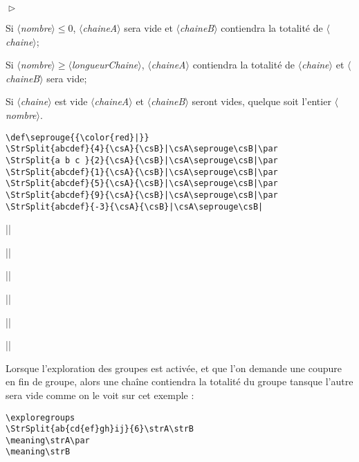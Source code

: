 \documentclass[a4paper,10pt,french]{article}
\newcommand\argu[1]{$\langle$\textit{#1}$\rangle$}
\newenvironment{Conditions}[1][1cm]%
{\begin{list}%
	{$\vartriangleright$}%
	{\setlength{\leftmargin}{#1}
	 \setlength{\itemsep}{0pt}
	 \setlength{\parsep}{0pt}
	 \setlength{\topsep}{2ptplus3ptminus2pt}
	}}%
{\end{list}}
\newcommand\styleexercice{\footnotesize}
\begin{document}
\begin{Conditions}
	\item Si \argu{nombre}${}\leqslant0$, \argu{chaineA} sera vide et \argu{chaineB} contiendra la totalité de \argu{chaine};
	\item Si \argu{nombre}${}\geqslant$\argu{longueurChaine}, \argu{chaineA} contiendra la totalité de \argu{chaine} et \argu{chaineB} sera vide;
	\item Si \argu{chaine} est vide \argu{chaineA} et \argu{chaineB} seront vides, quelque soit l'entier \argu{nombre}.
\end{Conditions}

\begin{minipage}[c]{0.65\linewidth}
\hfill
\begin{lstlisting}
\def\seprouge{{\color{red}|}}
\StrSplit{abcdef}{4}{\csA}{\csB}|\csA\seprouge\csB|\par
\StrSplit{a b c }{2}{\csA}{\csB}|\csA\seprouge\csB|\par
\StrSplit{abcdef}{1}{\csA}{\csB}|\csA\seprouge\csB|\par
\StrSplit{abcdef}{5}{\csA}{\csB}|\csA\seprouge\csB|\par
\StrSplit{abcdef}{9}{\csA}{\csB}|\csA\seprouge\csB|\par
\StrSplit{abcdef}{-3}{\csA}{\csB}|\csA\seprouge\csB|
\end{lstlisting}%
\end{minipage}\hfill
\begin{minipage}[c]{0.35\linewidth}
\styleexercice
\def\seprouge{{\color{red}|}}
|\csA\seprouge\csB|\par
{}|\csA\seprouge\csB|\par
{}|\csA\seprouge\csB|\par
{}|\csA\seprouge\csB|\par
{}|\csA\seprouge\csB|\par
{}|\csA\seprouge\csB|
\end{minipage}%

\setverbdelim{|}\medskip

Lorsque l'exploration des groupes est activée, et que l'on demande une coupure en fin de groupe, alors une chaîne contiendra la totalité du groupe tansque l'autre sera vide comme on le voit sur cet exemple :\par\nobreak\smallskip
\begin{minipage}[c]{0.65\linewidth}
\hfill
\begin{lstlisting}
\exploregroups
\StrSplit{ab{cd{ef}gh}ij}{6}\strA\strB
\meaning\strA\par
\meaning\strB
\end{lstlisting}%
\end{minipage}\hfill
\begin{minipage}[c]{0.35\linewidth}
	\styleexercice
	\exploregroups
	\strA\strB
	\meaning\strA\par
	\meaning\strB
\end{minipage}%
\medskip
\end{document}
